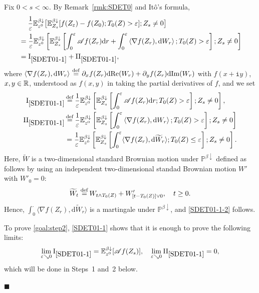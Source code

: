 \documentclass[12pt, twoside]{article}
\numberwithin{figure}{section}
\renewcommand{\Re}{{\rm Re}}
\renewcommand{\Im}{{\rm Im}}
\newcommand{\1}{\mathds 1}
\newcommand{\vep}{{\varepsilon}}
\newcommand{\da}{{\downarrow}}
\newcommand{\la}{{\langle}}
\newcommand{\ra}{{\rangle}}
\newcommand{\ms}{\mathscr}
\renewcommand{\P}{{\mathbb P}}
\newcommand{\E}{{\mathbb E}}
\renewcommand{\d}{{\mathrm d}}
\newcommand{\R}{{\Bbb R}}
\newcommand{\2}{{\mathbf 1}}
\renewcommand{\i}{{\mathtt i}}
\newcommand{\defeq}{{\stackrel{\rm def}{=}}}
\renewenvironment{proof}[1][\proofname]{\noindent {\bfseries #1.}\;}{\hfill\ensuremath{\blacksquare}\\}
\newcommand{\I}{{\rm I}}
\newcommand{\II}{{\rm II}}
\begin{document}
\begin{proof}[Proof of Proposition~\ref{prop:step2}]
Fix $0<s<\infty$. By Remark~\ref{rmk:SDET0} and It\^{o}'s formula,
\begin{align}
&\quad\;\frac{1}{\vep}\E^{\beta\da}_{z^0}\bigl[\E^{\beta\da}_{Z_s}[f(Z_{\vep})-f(Z_0);T_0(Z)> \vep];Z_s\neq 0\bigr]\notag\\
&=\frac{1}{\vep}\E^{\beta\da}_{z^0}\left[\E^{\beta\da}_{Z_s}\left[\int_0^\vep \ms A f(Z_r)\d r+\int_0^\vep \left\langle\nabla f(Z_r),\d W_r\right\rangle;T_0(Z)> \vep\right];Z_s\neq 0\right]\notag\\
&=\I_{\ref{SDET01-1}}+\II_{\ref{SDET01-1}},\label{SDET01-1}
\end{align}
where $ \left\langle\nabla f(Z_r),\d W_r\right\rangle\,\defeq\;\partial_x f(Z_r)\d \Re(W_r)+\partial_y f(Z_r)\d \Im(W_r)$ with $f(x+\i y)$, $x,y\in \R$, understood as $f(x,y)$ in taking the partial derivatives of $f$, 
and we set
\begin{align}
\I_{\ref{SDET01-1}}&\,\defeq\, \frac{1}{\vep}\E_{z^0}^{\beta\da}\left[\E^{\beta\da}_{Z_s}\left[\int_0^\vep \ms A f(Z_r)\d r;T_0(Z)>\vep\right];Z_s\neq 0\right],\notag\\
\II_{\ref{SDET01-1}}&\,\defeq\,  \frac{1}{\vep}\E_{z^0}^{\beta\da}\left[\E^{\beta\da}_{Z_s}\left[\int_0^\vep \left\langle\nabla f(Z_r),\d W_r\right\rangle;T_0(Z)> \vep\right];Z_s\neq 0\right]\notag\\
&=\frac{1}{\vep}\E_{z^0}^{\beta\da}\left[\E^{\beta\da}_{Z_s}\left[\int_0^\vep \langle\nabla f(Z_r),\d \widetilde{W}_r\rangle;T_0(Z)\leq \vep\right];Z_s\neq 0\right].\label{SDET01-1-2}
\end{align}
Here,
 $\widetilde{W}$ is a two-dimensional standard Brownian motion under $\P^{\beta\da}$ defined as follows by using an independent two-dimensional standad Brownian motion $W'$ with $W'_0=0$:
\begin{align*}
\widetilde{W}_t\;\defeq\,W_{t\wedge T_0(Z)}+W'_{[t-T_0(Z)]\vee 0},\quad t\geq 0.
\end{align*}
Hence, $\int_0^\cdot \la \nabla f(Z_r),\d \widetilde{W}_r\ra$ is a martingale under $\P^{\beta\da}$, and \eqref{SDET01-1-2} follows. 

To prove \eqref{goal:step2}, \eqref{SDET01-1} shows that it is enough to prove the following limits:
\begin{align}\label{ZSDE:lim-1}
\lim_{\vep \searrow 0}\I_{\ref{SDET01-1}}=\E_{z^0}^{\beta\da}[\ms Af(Z_s)]
,\quad \lim_{\vep \searrow 0}\II_{\ref{SDET01-1}}=0,
\end{align}
which will be done in Steps~1 and~2 below.\smallskip 


\end{proof}
\end{document}
